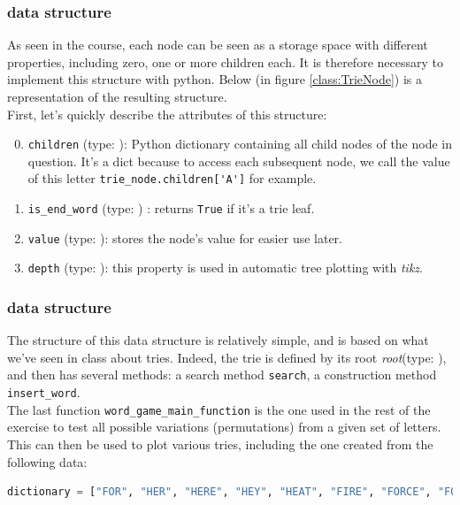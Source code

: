 \documentclass[10pt,a4paper,hidelinks]{article}
\begin{document}
\subsubsection{ data structure}

As seen in the course, each node can be seen as a storage space with different properties, including zero, one or more children each. It is therefore necessary to implement this structure with python. Below (in figure \ref{class:TrieNode}) is a representation of the resulting structure.\\

First, let's quickly describe the attributes of this structure:
\begin{enumerate}
    \setcounter{enumi}{-1}
    \item \verb|children| (type: ): Python dictionary containing all child nodes of the node in question. It's a dict because to access each subsequent node, we call the value of this letter \verb|trie_node.children['A']| for example.
    \item \verb|is_end_word| (type: ) : returns \verb|True| if it's a trie leaf.
    \item \verb|value| (type: ): stores the node's value for easier use later.
    \item \verb|depth| (type: ): this property is used in automatic tree plotting with \textit{tikz}.
\end{enumerate}

\subsubsection{ data structure}

The structure of this data structure is relatively simple, and is based on what we've seen in class about tries. Indeed, the trie is defined by its root \textit{root}(type: ), and then has several methods: a search method \verb|search|, a construction method \verb|insert_word|.\\
The last function \verb|word_game_main_function| is the one used in the rest of the exercise to test all possible variations (permutations) from a given set of letters.\\

This can then be used to plot various tries, including the one created from the following data:
\begin{lstlisting}[language=Python, caption=Sample data to create trie]
dictionary = ["FOR", "HER", "HERE", "HEY", "HEAT", "FIRE", "FORCE", "FORWARD", "FORWARDER", "FIRM", "FIRSTLY", "FIRSTS", "FIREWORK", "HEIGHTY", "HEIGHTEEN", "FIREWALL"]
\end{lstlisting}
\small{}
\end{document}
